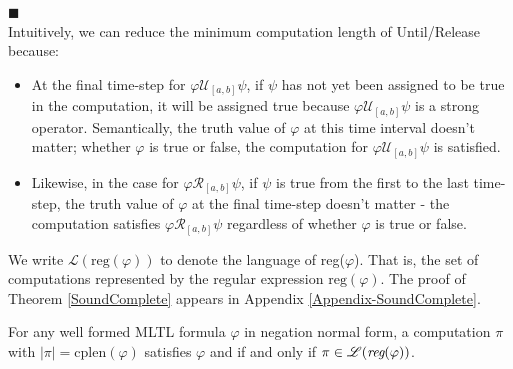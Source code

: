 \documentclass[runningheads]{llncs}
\renewcommand{\phi}{\varphi}
\begin{document}
 \vspace{-0.25in} \hfill $\blacksquare$\\
 \noindent Intuitively, we can reduce the minimum computation length of Until/Release because:
 \begin{itemize}
     \item At the final time-step for $\phi \mathcal{U}_{[a,b]} \psi$, if $\psi$ has not yet been assigned to be true in the computation, it will be assigned true because $\phi \mathcal{U}_{[a,b]} \psi$ is a strong operator. Semantically, the truth value of $\phi$ at this time interval doesn't matter; whether $\phi$ is true or false, the computation for $\phi \mathcal{U}_{[a,b]} \psi$ is satisfied.
     \item Likewise, in the case for $\phi \mathcal{R}_{[a,b]} \psi$, if $\psi$ is true from the first to the last time-step, the truth value of $\phi$ at the final time-step doesn't matter - the computation satisfies $\phi \mathcal{R}_{[a,b]} \psi$ regardless of whether $\phi$ is true or false.
 \end{itemize}

 We write $\mathscr{L}(\text{reg}(\phi))$ to denote the language of reg($\phi$). That is, the set of computations represented by the regular expression $\text{reg}(\phi)$. The proof of Theorem \ref{SoundComplete} appears in Appendix \ref{Appendix-SoundComplete}.
 
 \begin{theorem} \label{SoundComplete}
 For any well formed MLTL formula $\phi$ in negation normal form, a computation $\pi$ with $|\pi| = \text{cplen}(\phi)$ satisfies $\phi$ and  if and only if $\pi \in \mathscr{L}(\emph{reg}(\phi))$.
 \end{theorem}



 
 
\end{document}
